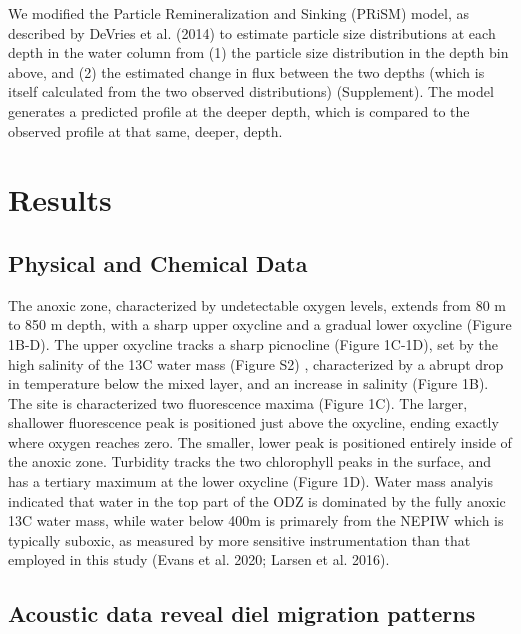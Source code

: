 \documentclass[]{article}
\begin{document}
We modified the Particle Remineralization and Sinking (PRiSM) model, as
described by DeVries et al. (2014) to estimate particle size
distributions at each depth in the water column from (1) the particle
size distribution in the depth bin above, and (2) the estimated change
in flux between the two depths (which is itself calculated from the two
observed distributions) (Supplement). The model generates a predicted
profile at the deeper depth, which is compared to the observed profile
at that same, deeper, depth.

\hypertarget{results}{%
\section{Results}\label{results}}

\hypertarget{physical-and-chemical-data}{%
\subsection{Physical and Chemical
Data}\label{physical-and-chemical-data}}

The anoxic zone, characterized by undetectable oxygen levels, extends
from 80 m to 850 m depth, with a sharp upper oxycline and a gradual
lower oxycline (Figure 1B-D). The upper oxycline tracks a sharp
picnocline (Figure 1C-1D), set by the high salinity of the 13C water
mass (Figure S2) , characterized by a abrupt drop in temperature below
the mixed layer, and an increase in salinity (Figure 1B). The site is
characterized two fluorescence maxima (Figure 1C). The larger, shallower
fluorescence peak is positioned just above the oxycline, ending exactly
where oxygen reaches zero. The smaller, lower peak is positioned
entirely inside of the anoxic zone. Turbidity tracks the two chlorophyll
peaks in the surface, and has a tertiary maximum at the lower oxycline
(Figure 1D). Water mass analyis indicated that water in the top part of
the ODZ is dominated by the fully anoxic 13C water mass, while water
below 400m is primarely from the NEPIW which is typically suboxic, as
measured by more sensitive instrumentation than that employed in this
study (Evans et al. 2020; Larsen et al. 2016).

\hypertarget{acoustic-data-reveal-diel-migration-patterns}{%
\subsection{Acoustic data reveal diel migration
patterns}\label{acoustic-data-reveal-diel-migration-patterns}}
\end{document}
